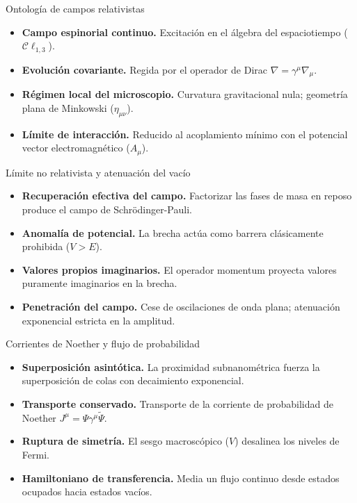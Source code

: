 \begin{frame}{Ontología de campos relativistas}
  \begin{itemize}
    \item \textbf{Campo espinorial continuo.} Excitación en el álgebra del
    espaciotiempo ($\mathcal{C}\ell_{1,3}$).
    \item \textbf{Evolución covariante.} Regida por el operador de Dirac
    $\nabla = \gamma^\mu \nabla_\mu$.
    \item \textbf{Régimen local del microscopio.} Curvatura gravitacional
    nula; geometría plana de Minkowski ($\eta_{\mu\nu}$).
    \item \textbf{Límite de interacción.} Reducido al acoplamiento mínimo
    con el potencial vector electromagnético ($A_\mu$).
  \end{itemize}
\end{frame}

\begin{frame}{Límite no relativista y atenuación del vacío}
  \begin{itemize}
    \item \textbf{Recuperación efectiva del campo.} Factorizar las fases de
    masa en reposo produce el campo de Schrödinger-Pauli.
    \item \textbf{Anomalía de potencial.} La brecha actúa como barrera
    clásicamente prohibida ($V > E$).
    \item \textbf{Valores propios imaginarios.} El operador momentum proyecta
    valores puramente imaginarios en la brecha.
    \item \textbf{Penetración del campo.} Cese de oscilaciones de onda plana;
    atenuación exponencial estricta en la amplitud.
  \end{itemize}
\end{frame}

\begin{frame}{Corrientes de Noether y flujo de probabilidad}
  \begin{itemize}
    \item \textbf{Superposición asintótica.} La proximidad subnanométrica
    fuerza la superposición de colas con decaimiento exponencial.
    \item \textbf{Transporte conservado.} Transporte de la corriente de
    probabilidad de Noether $J^\mu = \Psi \gamma^\mu \tilde{\Psi}$.
    \item \textbf{Ruptura de simetría.} El sesgo macroscópico ($V$)
    desalinea los niveles de Fermi.
    \item \textbf{Hamiltoniano de transferencia.} Media un flujo continuo
    desde estados ocupados hacia estados vacíos.
  \end{itemize}
\end{frame}

